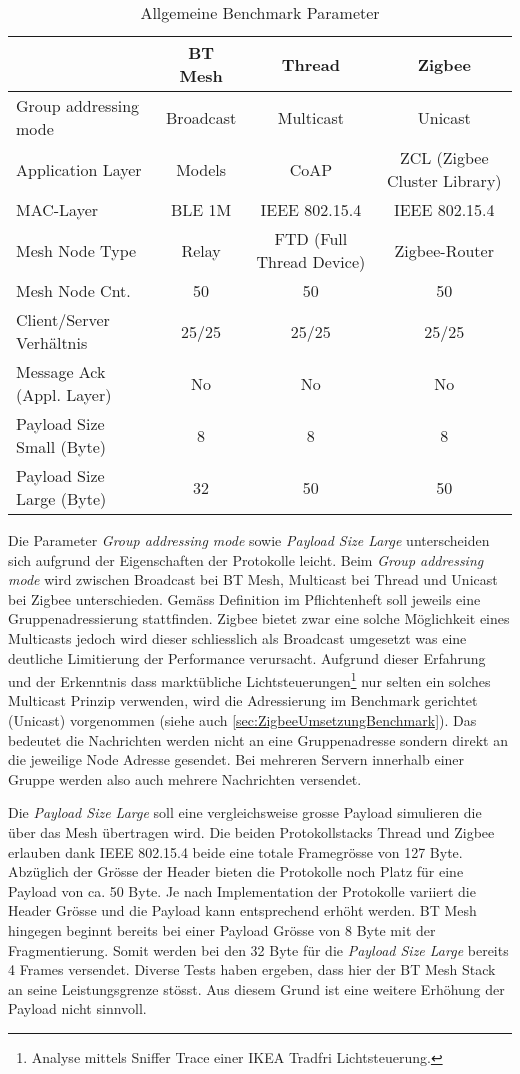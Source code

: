\begin{table}[h]
\centering
\begin{adjustbox}{width=1\textwidth}
\begin{tabular}{lccc} 
\toprule
 & BT Mesh & Thread & Zigbee \\ 
\hline
Group addressing mode & Broadcast & Multicast & Unicast \\
Application Layer & Models & CoAP & ZCL (Zigbee Cluster Library) \\
MAC-Layer & BLE 1M & IEEE 802.15.4 & IEEE 802.15.4 \\
Mesh Node Type & Relay & FTD (Full Thread Device) & Zigbee-Router \\
Mesh Node Cnt. & 50 & 50 & 50 \\
Client/Server Verhältnis & 25/25 & 25/25 & 25/25 \\
Message Ack (Appl. Layer) & No & No & No \\
Payload Size Small (Byte) & 8 & 8 & 8 \\
Payload Size Large (Byte) & 32 & 50 & 50 \\
\bottomrule
\end{tabular}
\end{adjustbox}
\caption{Allgemeine Benchmark Parameter}
\label{tab:AllgemeineBenchmarkParameter}
\end{table}

Die Parameter \textit{Group addressing mode} sowie \textit{Payload Size Large} unterscheiden sich aufgrund der Eigenschaften der Protokolle leicht.
Beim \textit{Group addressing mode} wird zwischen Broadcast bei BT Mesh, Multicast bei Thread und Unicast bei Zigbee unterschieden. Gemäss Definition im Pflichtenheft soll jeweils eine Gruppenadressierung stattfinden. Zigbee bietet zwar eine solche Möglichkeit eines Multicasts jedoch wird dieser schliesslich als Broadcast umgesetzt was eine deutliche Limitierung der Performance verursacht.
Aufgrund dieser Erfahrung und der Erkenntnis dass marktübliche Lichtsteuerungen\footnote{Analyse mittels Sniffer Trace einer IKEA Tradfri Lichtsteuerung.} nur selten ein solches Multicast Prinzip verwenden, wird die Adressierung im Benchmark gerichtet (Unicast) vorgenommen (siehe auch \ref{sec:ZigbeeUmsetzungBenchmark}).
Das bedeutet die Nachrichten werden nicht an eine Gruppenadresse sondern direkt an die jeweilige Node Adresse gesendet. Bei mehreren Servern innerhalb einer Gruppe werden also auch mehrere Nachrichten versendet.

Die \textit{Payload Size Large} soll eine vergleichsweise grosse Payload simulieren die über das Mesh übertragen wird.
Die beiden Protokollstacks Thread und Zigbee erlauben dank IEEE 802.15.4 beide eine totale Framegrösse von 127 Byte.
Abzüglich der Grösse der Header bieten die Protokolle noch Platz für eine Payload von ca. 50 Byte. Je nach Implementation der Protokolle variiert die Header Grösse und die Payload kann entsprechend erhöht werden.
BT Mesh hingegen beginnt bereits bei einer Payload Grösse von 8 Byte mit der Fragmentierung. Somit werden bei den 32 Byte für die \textit{Payload Size Large} bereits 4 Frames versendet. Diverse Tests haben ergeben, dass hier der BT Mesh Stack an seine Leistungsgrenze stösst.
Aus diesem Grund ist eine weitere Erhöhung der Payload nicht sinnvoll.


